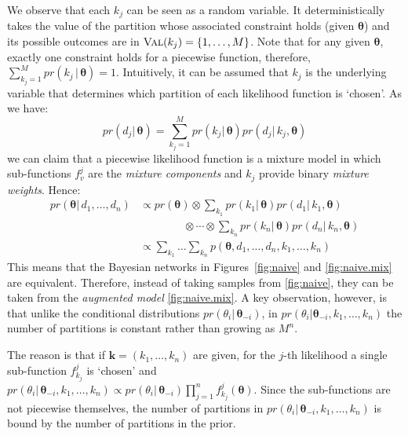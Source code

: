 \documentclass[letterpaper]{article}
\newcommand{\bvec}[1]{\textbf{#1}}
\begin{document}
We observe that each $k_j$ can be seen as a random variable. 
It deterministically takes the value of the partition whose associated constraint holds (given $\boldsymbol\theta$) and its possible outcomes are in $\textsc{Val}(k_j) = \{1, \ldots, M\}$. 
Note that for any given $\boldsymbol\theta$, exactly one constraint holds for a piecewise function, therefore, 
$\sum_{k_j = 1}^M pr(k_j \,|\, \boldsymbol\theta) = 1$.
Intuitively, it can be assumed that $k_j$ is the underlying variable that determines which partition of each likelihood function is `chosen'. As we have: 
{\small
\begin{equation}
\label{e:aaaax}
pr(d_j | \, \boldsymbol\theta) = \sum_{k_j = 1}^M pr(k_j | \, \boldsymbol\theta) pr(d_j | \, k_j, \boldsymbol\theta) 
\end{equation}
}%
we can claim that a piecewise likelihood function is a mixture model in which sub-functions $f^j_v$ are the \emph{mixture components} and 
 $k_j$ provide binary \emph{mixture weights}. Hence:
{\small
\begin{align*}
pr(\boldsymbol\theta | \, d_1, \ldots, d_n) 
&\propto
pr(\boldsymbol\theta) \otimes
\sum_{k_1}pr(k_1 | \, \boldsymbol\theta) pr(d_1 | \, k_1, \boldsymbol\theta) \\
&\qquad\qquad \otimes
\cdots \otimes
\sum_{k_n}pr(k_n | \, \boldsymbol\theta) pr(d_n | \, k_n, \boldsymbol\theta)
\\
&\propto
\sum_{k_1} \ldots \sum_{k_n} p(\boldsymbol\theta, d_1, \ldots, d_n, k_1, \ldots, k_n) 
\end{align*}}
This means that the Bayesian networks in Figures~\ref{fig:naive} and \ref{fig:naive.mix} are equivalent.
Therefore, instead of taking samples from \ref{fig:naive}, 
they can be taken from the \emph{augmented model} \ref{fig:naive.mix}. A key observation, however, is that 
unlike the conditional distributions $pr(\theta_i | \, \boldsymbol\theta_{-i})$, 
in $pr(\theta_i | \boldsymbol\theta_{-i}, k_1, \ldots, k_n)$ 
the number of partitions is constant rather than growing as $M^n$.

The reason is that if  $\bvec{k}= (k_1, \ldots, k_n)$ are given, for the $j$-th 
likelihood a single sub-function $f^j_{k_j}$ is `chosen' and
$pr(\theta_i | \, \boldsymbol\theta_{-i}, k_1, \ldots, k_n) \propto
pr(\theta_i | \, \boldsymbol\theta_{-i})
\prod_{j=1}^n f^j_{k_j}(\boldsymbol\theta)$.
Since the sub-functions are not piecewise themselves, 
the number of partitions in $pr(\theta_i |\, \boldsymbol\theta_{-i},  k_1, \ldots, k_n)$ is bound by the number of partitions in the prior.
\end{document}

